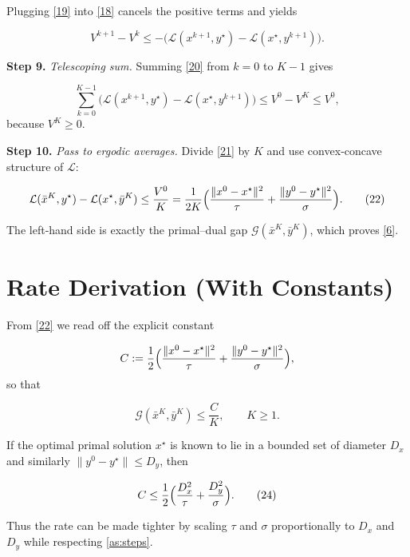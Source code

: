 \documentclass{article}
\newcommand{\gap}{\mathcal{G}}
\begin{document}
Plugging \eqref{19} into \eqref{18} cancels the positive terms and yields

\[
V^{k+1} - V^{k}
\le -\bigl(\mathcal{L}(x^{k+1},y^{\star})-\mathcal{L}(x^{\star},y^{k+1})\bigr).
\tag{20}
\]

\noindent\textbf{Step 9.} \emph{Telescoping sum.}  
Summing \eqref{20} from $k=0$ to $K-1$ gives

\[
\sum_{k=0}^{K-1}\bigl(\mathcal{L}(x^{k+1},y^{\star})-\mathcal{L}(x^{\star},y^{k+1})\bigr)
\le V^{0}-V^{K}
\le V^{0},
\tag{21}
\]
because $V^{K}\ge0$.

\noindent\textbf{Step 10.} \emph{Pass to ergodic averages.}  
Divide \eqref{21} by $K$ and use convex‑concave structure of $\mathcal{L}$:

\[
\mathcal{L}(\bar{x}^{K},y^{\star})-\mathcal{L}(x^{\star},\bar{y}^{K})
\le\frac{V^{0}}{K}
= \frac{1}{2K}\Bigl(\frac{\|x^{0}-x^{\star}\|^{2}}{\tau}
+\frac{\|y^{0}-y^{\star}\|^{2}}{\sigma}\Bigr).
\tag{22}
\]

The left‑hand side is exactly the primal–dual gap $\gap(\bar{x}^{K},\bar{y}^{K})$, which proves \eqref{6}. \hfill\qedsymbol

\section*{Rate Derivation (With Constants)}
From \eqref{22} we read off the explicit constant  

\[
C:=\frac12\Bigl(\frac{\|x^{0}-x^{\star}\|^{2}}{\tau}
+\frac{\|y^{0}-y^{\star}\|^{2}}{\sigma}\Bigr),
\]
so that  

\[
\gap(\bar{x}^{K},\bar{y}^{K})\le \frac{C}{K},\qquad K\ge1.
\tag{23}
\]

If the optimal primal solution $x^{\star}$ is known to lie in a bounded set of diameter $D_{x}$ and similarly $\|y^{0}-y^{\star}\|\le D_{y}$, then  

\[
C\le \frac12\Bigl(\frac{D_{x}^{2}}{\tau}+\frac{D_{y}^{2}}{\sigma}\Bigr).
\tag{24}
\]

Thus the rate can be made tighter by scaling $\tau$ and $\sigma$ proportionally to $D_{x}$ and $D_{y}$ while respecting \eqref{as:steps}.
\end{document}
